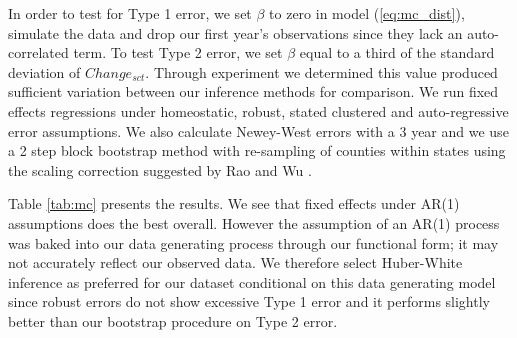 \documentclass[12pt]{article}
\begin{document}
In order to test for Type 1 error, we set $\beta$ to zero in model (\ref{eq:mc_dist}), simulate the data and drop our first year's observations since they lack an auto-correlated term. To test Type 2 error, we set $\beta$ equal to a third of the standard deviation of $Change_{sct}$. Through experiment we determined this value produced sufficient variation between our inference methods for comparison. We run fixed effects regressions under homeostatic, robust, stated clustered and auto-regressive error assumptions. We also calculate Newey-West errors with a 3 year and we use a 2 step block bootstrap method with re-sampling of counties within states using the scaling correction suggested by Rao and Wu \citep{rao1988resampling}. 

Table \ref{tab:mc} presents the results. We see that fixed effects under AR(1) assumptions does the best overall. However the assumption of an AR(1) process was baked into our data generating process through our functional form; it may not accurately reflect our observed data. We therefore select Huber-White inference as preferred for our dataset conditional on this data generating model since robust errors do not show excessive Type 1 error and it performs slightly better than our bootstrap procedure on Type 2 error.
\end{document}
